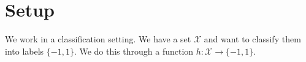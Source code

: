 \documentclass[a4paper]{amsart}
\begin{document}









\section{Setup}

We work in a classification setting. We have a set $\mathcal{X}$ and want to classify them into labels $\{-1, 1\}$. We do this through a  function $h: \mathcal{X} \rightarrow \{-1, 1\}$.
\end{document}
